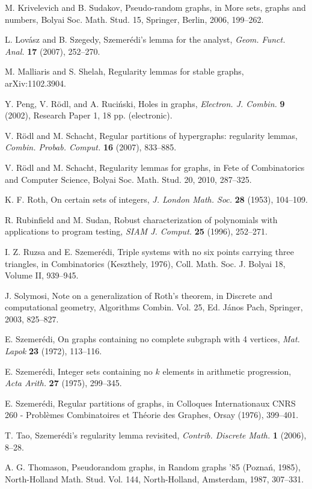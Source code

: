 \documentclass[11pt]{article}
\begin{document}
\begin{thebibliography}{}
M. Krivelevich and B. Sudakov, Pseudo-random graphs, in {More sets, graphs and
numbers,} Bolyai Soc. Math. Stud. 15, Springer, Berlin, 2006, 199--262.

L. Lov\'asz and B. Szegedy, Szemer\'edi's lemma for the analyst, {\it Geom.
Funct. Anal.} {\bf 17} (2007), 252--270.

 M. Malliaris and S. Shelah,
Regularity lemmas for stable graphs, arXiv:1102.3904.

Y. Peng, V. R\"odl, and A. Ruci\'nski, Holes in graphs, {\it Electron. J.
Combin.} {\bf 9} (2002), Research Paper 1, 18 pp. (electronic).

 V. R\"odl and M. Schacht, Regular partitions of hypergraphs:
regularity lemmas, {\it Combin. Probab. Comput.} {\bf 16} (2007), 833--885.

 V. R\"odl and M. Schacht, Regularity lemmas for graphs,
in Fete of Combinatorics and Computer Science, Bolyai Soc. Math.
Stud. 20, 2010, 287--325.

K. F. Roth, On certain sets of integers, {\it J. London Math. Soc.} {\bf 28}
(1953), 104--109.

R. Rubinfield and M. Sudan, Robust characterization of polynomials with
applications to program
testing, {\it SIAM J. Comput.} {\bf 25} (1996), 252--271.

I. Z. Ruzsa and E. Szemer\'edi, Triple systems with no six points carrying
three triangles, in
Combinatorics (Keszthely, 1976), Coll. Math. Soc. J. Bolyai 18, Volume II,
939--945.

 J. Solymosi, Note on a generalization of Roth's theorem, in
Discrete and computational geometry, Algorithms Combin. Vol. 25, Ed. J\'anos
Pach, Springer, 2003, 825--827.

 E. Szemer\'edi, On graphs containing no complete subgraph with 4
vertices, {\it Mat. Lapok} {\bf 23} (1972), 113--116.

 E. Szemer\'edi, Integer sets containing no $k$ elements in
arithmetic progression, {\it Acta
Arith.} {\bf 27} (1975), 299--345.

 E. Szemer\'edi, Regular partitions of graphs, in Colloques
Internationaux CNRS 260 - Probl\`emes
Combinatoires et Th\'eorie des Graphes, Orsay (1976), 399--401.

 T. Tao, Szemer\'edi's regularity lemma revisited, {\it Contrib.
Discrete Math.} {\bf 1} (2006), 8--28.

A. G. Thomason, Pseudorandom graphs, in {Random graphs '85} (Pozna\'n,
1985), North-Holland Math. Stud. Vol. 144, North-Holland, Amsterdam, 1987,
307--331.


\end{thebibliography}
\end{document}
